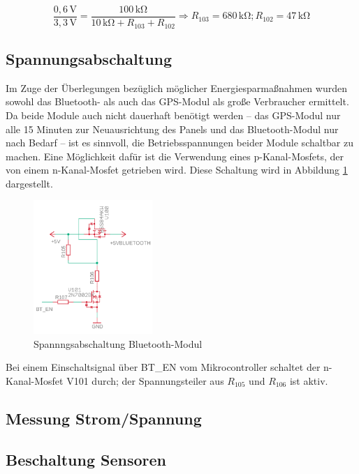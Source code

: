 \begin{minipage}{\textwidth}
\begin{equation}\label{eq:Spannungsteiler5vb}
\frac {0,6\,\si{\volt}}{3,3\,\si{\volt}}{=}  \frac{100\,\si{\kilo\ohm}}{10\,\si{\kilo\ohm}+R_{103}+R_{102}} \Rightarrow R_{103}=680\,\si{\kilo\ohm}; R_{102}=47\,\si{\kilo\ohm}
\end{equation}
\end{minipage}



\subsection{Spannungsabschaltung}\label{subsec.Spannungsabschaltung}
Im Zuge der Überlegungen bezüglich möglicher Energiesparmaßnahmen wurden sowohl das Bluetooth- als auch das GPS-Modul als große Verbraucher ermittelt. Da beide Module auch nicht dauerhaft benötigt werden -- das GPS-Modul nur alle 15 Minuten zur Neuausrichtung des Panels und das Bluetooth-Modul nur nach Bedarf -- ist es sinnvoll, die Betriebsspannungen beider Module schaltbar zu machen. Eine Möglichkeit dafür ist die Verwendung eines p-Kanal-Mosfets, der von einem n-Kanal-Mosfet getrieben wird. Diese Schaltung wird in Abbildung \ref{fig.spgsabschaltung} dargestellt.

\begin{figure}[H]
  \centering
  \includegraphics[width=0.4\textwidth]{./img/spannungsabschaltung.png}
  \caption{Spannngsabschaltung Bluetooth-Modul}\label{fig.spgsabschaltung}
\end{figure}

Bei einem Einschaltsignal über BT\_EN vom Mikrocontroller schaltet der n-Kanal-Mosfet V101 durch; der Spannungsteiler aus $R_{105}$ und $R_{106}$ ist aktiv. 

\subsection{Messung Strom/Spannung}\label{subsec.MessungStromSpannung}

\subsection{Beschaltung Sensoren}\label{subsec.BeschaltungSensoren}



